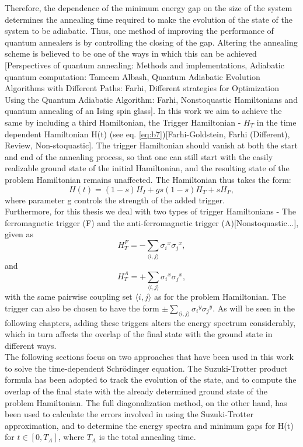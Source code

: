 \documentclass[../main.tex]{subfiles}
\begin{document}
Therefore, the dependence of the minimum energy gap on the size of the system determines the annealing time required to make the evolution of the state of the system to be adiabatic. Thus, one method of improving the performance of quantum annealers is by controlling the closing of the gap. Altering the annealing scheme is believed to be one of the ways in which this can be achieved [Perspectives of quantum annealing: Methods and implementations, Adiabatic quantum computation: Tameem Albash, Quantum Adiabatic Evolution Algorithms with Different Paths: Farhi, Different strategies for Optimization Using the Quantum Adiabatic Algorithm: Farhi, Nonstoquastic Hamiltonians and quantum annealing of an Ising spin glass]. In this work we aim to achieve the same by including a third Hamiltonian, the Trigger Hamiltonian - $H_T$ in the time dependent Hamiltonian H(t) (see eq. \ref{eq:b7})[Farhi-Goldstein, Farhi (Different), Review, Non-stoquastic]. The trigger Hamiltonian should vanish at both the start and end of the annealing process, so that one can still start with the easily realizable ground state of the initial Hamiltonian, and the resulting state of the problem Hamiltonian remains unaffected. The Hamiltonian thus takes the form: 
\begin{equation}
H(t)= (1-s)H_I + g s(1-s)H_T + sH_P ,\label{eq:b12}
\end{equation} 
where parameter g controls the strength of the added trigger.\\
Furthermore, for this thesis we deal with two types of trigger Hamiltonians - The ferromagnetic trigger (F) and the anti-ferromagnetic trigger (A)[Nonstoquastic...], given as
\begin{equation}
H_T^F = - \sum\limits_{\langle i,j\rangle}{\sigma_i}^x{\sigma_j}^x,    \label{eq:b13}
\end{equation}
and
\begin{equation}
H_T^A= +\sum\limits_{\langle i,j \rangle}{\sigma_i}^x{\sigma_j}^x,          \label{eq:b14}
\end{equation}
with the same pairwise coupling set $\langle i,j \rangle$ as for the problem Hamiltonian. The trigger can also be chosen to have the form $\pm  \sum\limits_{\langle i,j\rangle}{\sigma_i}^y{\sigma_j}^y $.
As will be seen in the following chapters, adding these triggers alters the energy spectrum considerably, which in turn affects the overlap of the final state with the ground state in different ways. \\


The following sections focus on two approaches that have been used in this work to solve the time-dependent Schr{\"o}dinger equation. The Suzuki-Trotter product formula has been adopted to track the evolution of the state, and to compute the overlap of the final state with the already determined ground state of the problem Hamiltonian. The full diagonalization method, on the other hand, has been used to calculate the errors involved in using the Suzuki-Trotter approximation, and to determine the energy spectra and minimum gaps for H(t) for $t \in [0,T_A]$, where $T_A$ is the total annealing time.
\end{document}
